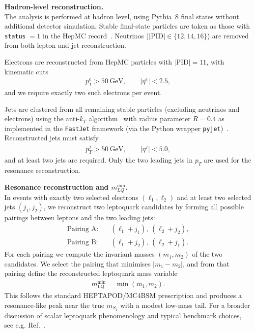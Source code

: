 \documentclass[submission, Phys]{SciPost}
\begin{document}
\begin{promptblock}
\textbf{Hadron-level reconstruction.}\\
The analysis is performed at hadron level, using Pythia~8 final states without
additional detector simulation.  Stable final-state particles are taken as those
with \texttt{status} $=1$ in the HepMC record~\cite{Dobbs:2001ck}. Neutrinos
($\lvert \text{PID} \rvert \in \{12,14,16\}$) are removed from both lepton and
jet reconstruction.

Electrons are reconstructed from HepMC particles with $\lvert \text{PID} \rvert = 11$,
with kinematic cuts
\begin{align}
  p_T^e > 50~\text{GeV},\qquad \lvert \eta^e \rvert < 2.5,
\end{align}
and we require exactly two such electrons per event.

Jets are clustered from all remaining stable particles (excluding neutrinos and
electrons) using the anti-$k_T$ algorithm~\cite{Cacciari:2008gp} with radius
parameter $R=0.4$ as implemented in the \texttt{FastJet} framework
(via the Python wrapper \texttt{pyjet})~\cite{Cacciari:2011ma}. Reconstructed jets
must satisfy
\begin{align}
  p_T^j > 50~\text{GeV},\qquad \lvert \eta^j \rvert < 5.0,
\end{align}
and at least two jets are required. Only the two leading jets in $p_T$ are used
for the resonance reconstruction.

\textbf{Resonance reconstruction and $m_{LQ}^{\min}$.}\\
In events with exactly two selected electrons $(\ell_1, \ell_2)$ and at least
two selected jets $(j_1, j_2)$, we reconstruct two leptoquark candidates by
forming all possible pairings between leptons and the two leading jets:
%
\begin{align}
  \text{Pairing A}: &\quad (\ell_1 + j_1),~(\ell_2 + j_2),\\
  \text{Pairing B}: &\quad (\ell_1 + j_2),~(\ell_2 + j_1).
\end{align}
%
For each pairing we compute the invariant masses $(m_1, m_2)$ of the two
candidates. We select the pairing that minimises $\lvert m_1 - m_2 \rvert$, and
from that pairing define the reconstructed leptoquark mass variable
%
\begin{align}
  m_\text{LQ}^{\min} = \min(m_1, m_2).
\end{align}
%
This follows the standard HEPTAPOD/MC4BSM prescription and produces a
resonance-like peak near the true $m_{S_1}$ with a modest low-mass tail. For a
broader discussion of scalar leptoquark phenomenology and typical benchmark
choices, see e.g. Ref.~\cite{Dorsner:2016wpm}.


\end{promptblock}
\end{document}
